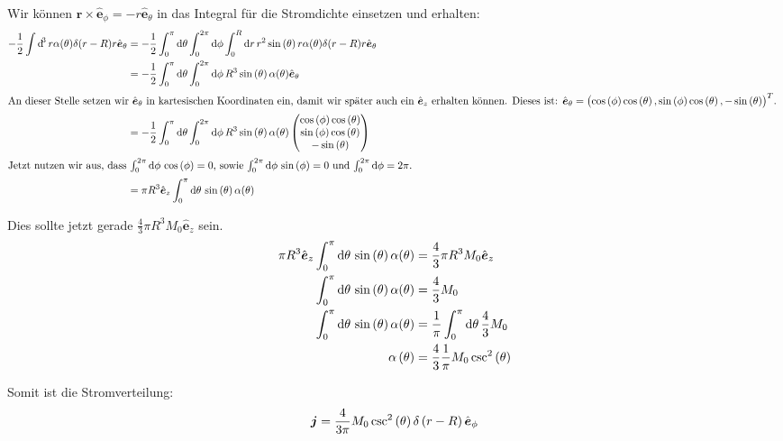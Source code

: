 \documentclass[11pt, ngerman, fleqn]{article}
\newcommand{\ev}{\hat{\vec e}}
\newcommand{\half}{\frac 12}
\renewcommand{\vec}[1]{\boldsymbol{#1}}
\begin{document}
Wir können $\vec r \times \ev_\phi = - r \ev_\theta$ in das Integral für die
Stromdichte einsetzen und erhalten:
\begin{align*}
	- \half \int \dif^3 r \alpha(\theta) \delta(r-R) r \ev_\theta
	&= - \half \int_0^\pi \dif \theta \int_0^{2 \pi} \dif \phi \int_0^R \dif r \, r^2 \sin\del\theta r \alpha(\theta) \delta(r-R) r \ev_\theta \\
	&= - \half \int_0^\pi \dif \theta \int_0^{2 \pi} \dif \phi \, R^3 \sin\del\theta \alpha(\theta) \ev_\theta \\
	\intertext{%
		An dieser Stelle setzen wir $\ev_\theta$ in kartesischen Koordinaten
		ein, damit wir später auch ein $\ev_z$ erhalten können. Dieses ist:
		$\ev_\theta = \del{\cos\del\phi \cos\del\theta, \sin\del\phi
		\cos\del\theta, - \sin\del\theta}^T$.
	}
	&= - \half \int_0^\pi \dif \theta \int_0^{2 \pi} \dif \phi \, R^3 \sin\del\theta \alpha(\theta) \begin{pmatrix}
		\cos\del\phi \cos\del\theta \\ \sin\del\phi \cos\del\theta \\ - \sin\del\theta
	\end{pmatrix} \\
	\intertext{%
		Jetzt nutzen wir aus, dass $\int_0^{2\pi} \dif \phi \, \cos\del\phi =
		0$, sowie $\int_0^{2\pi} \dif \phi \, \sin\del\phi = 0$ und
		$\int_0^{2\pi} \dif \phi = 2\pi$.
	}
	&= \pi R^3 \ev_z \int_0^\pi \dif \theta \, \sin\del\theta \alpha(\theta)
\end{align*}

Dies sollte jetzt gerade $\frac 43 \pi R^3 M_0 \ev_z$ sein.
\begin{align*}
	\pi R^3 \ev_z \int_0^\pi \dif \theta \, \sin\del\theta \alpha(\theta) &= \frac 43 \pi R^3 M_0 \ev_z \\
	\int_0^\pi \dif \theta \, \sin\del\theta \alpha(\theta) &= \frac 43 M_0 \\
	\int_0^\pi \dif \theta \, \sin\del\theta \alpha(\theta) &= \frac 1\pi \int_0^\pi \dif \theta \, \frac 43 M_0 \\
	\alpha\del\theta &= \frac 43 \frac 1\pi M_0 \csc^2\del\theta
\end{align*}

Somit ist die Stromverteilung:
\[
	\vec j = \frac 4{3\pi} M_0 \csc^2\del\theta \delta\del{r-R} \ev_\phi
\]

\end{document}
